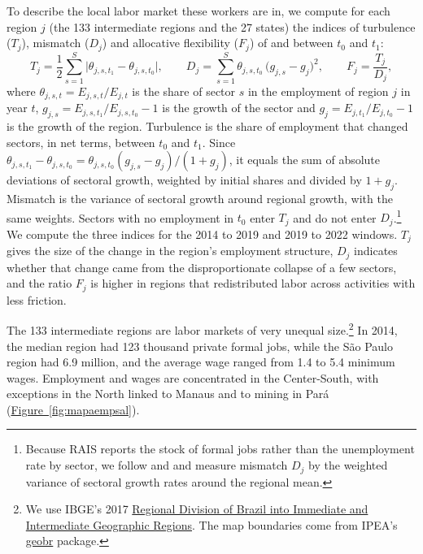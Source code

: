 \documentclass[11pt,a4paper]{article}
\let\citetorig\citet
\renewcommand{\citet}[1]{{\color{citeblue}\citetorig{#1}}}
\begin{document}
To describe the local labor market these workers are in, we compute for each region $j$ (the 133 intermediate regions and the 27 states) the indices of turbulence ($T_j$), mismatch ($D_j$) and allocative flexibility ($F_j$) of \citet{layard1991} and \citet{barros1997ppp} between $t_0$ and $t_1$:
\begin{equation}
T_j = \frac{1}{2} \sum_{s=1}^{S} \big|\theta_{j,s,t_1} - \theta_{j,s,t_0}\big|, \qquad D_j = \sum_{s=1}^{S} \theta_{j,s,t_0}\, \big(g_{j,s} - g_j\big)^2, \qquad F_j = \frac{T_j}{D_j},
\label{eq:barros_tdf}
\end{equation}
where $\theta_{j,s,t} = E_{j,s,t}/E_{j,t}$ is the share of sector $s$ in the employment of region $j$ in year $t$, $g_{j,s} = E_{j,s,t_1}/E_{j,s,t_0} - 1$ is the growth of the sector and $g_j = E_{j,t_1}/E_{j,t_0} - 1$ is the growth of the region. Turbulence is the share of employment that changed sectors, in net terms, between $t_0$ and $t_1$. Since $\theta_{j,s,t_1} - \theta_{j,s,t_0} = \theta_{j,s,t_0}(g_{j,s} - g_j)/(1+g_j)$, it equals the sum of absolute deviations of sectoral growth, weighted by initial shares and divided by $1+g_j$. Mismatch is the variance of sectoral growth around regional growth, with the same weights. Sectors with no employment in $t_0$ enter $T_j$ and do not enter $D_j$.\footnote{Because RAIS reports the stock of formal jobs rather than the unemployment rate by sector, we follow \citet{barros1997ppp} and \citet{staduto2010} and measure mismatch $D_j$ by the weighted variance of sectoral growth rates around the regional mean.} We compute the three indices for the 2014 to 2019 and 2019 to 2022 windows. $T_j$ gives the size of the change in the region's employment structure, $D_j$ indicates whether that change came from the disproportionate collapse of a few sectors, and the ratio $F_j$ is higher in regions that redistributed labor across activities with less friction.

The 133 intermediate regions are labor markets of very unequal size.\footnote{We use IBGE's 2017 \href{https://www.ibge.gov.br/geociencias/organizacao-do-territorio/divisao-regional/15778-divisoes-regionais-do-brasil.html}{Regional Division of Brazil into Immediate and Intermediate Geographic Regions}. The map boundaries come from IPEA's \href{https://github.com/ipeaGIT/geobr}{geobr} package.} In 2014, the median region had 123 thousand private formal jobs, while the São Paulo region had 6.9 million, and the average wage ranged from 1.4 to 5.4 minimum wages. Employment and wages are concentrated in the Center-South, with exceptions in the North linked to Manaus and to mining in Pará (\hyperref[fig:mapaempsal]{Figure~\ref*{fig:mapaempsal}}).
\end{document}
